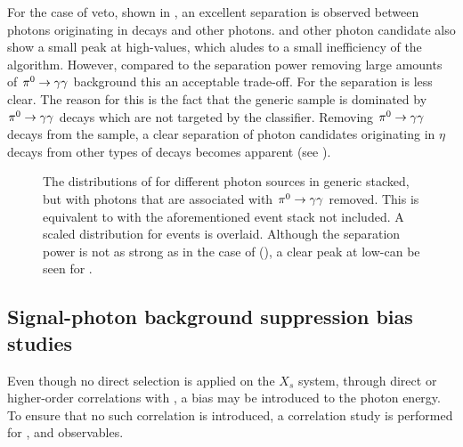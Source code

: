 For the case of \piz veto, shown in , an excellent separation is observed between photons originating in \piz decays and other photons.
\BtoXsgamma and other photon candidate also show a small peak at high-\piVeto values, which aludes to a small inefficiency of the algorithm.
However, compared to the separation power removing large amounts of $\pi^0\rightarrow\gamma\gamma$ background this an acceptable trade-off.
For \etaVeto the separation is less clear.
The reason for this is the fact that the generic \MC sample is dominated by $\pi^0\rightarrow\gamma\gamma$ decays which are not targeted by the \etaVeto classifier.
Removing $\pi^0\rightarrow\gamma\gamma$ decays from the sample, a clear separation of photon candidates originating in $\eta$ decays from other types of decays becomes apparent (see ).

\begin{figure}[htbp!]
    \centering
    \caption{\label{fig:vetos_nopi} The distributions of \etaVeto {} 
    for different photon sources in generic \MC stacked, but with photons that are associated with $\pi^0\rightarrow\gamma\gamma$ removed.
    This is equivalent to  with the aforementioned event stack not included.
    A scaled \etaVeto distribution for \BtoXsgamma events is overlaid.
    Although the separation power is not as strong as in the case of \piVeto (), a clear peak at low-\etaVeto can be seen for \BtoXsgamma.
    }
\end{figure}

\subsection{Signal-photon background suppression bias studies}\label{sec:signal_photon_correlation}

Even though no direct selection is applied on the $X_s$ system, through direct or higher-order correlations with \EB, a bias may be introduced to the photon energy.
To ensure that no such correlation is introduced, a correlation study is performed for \piVeto, \etaVeto and \ZMVA observables.


